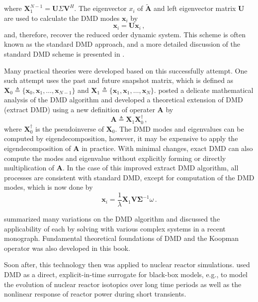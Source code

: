 where $\mathbf{X}_1^{N-1} = \mathbf{U}\Sigma \mathbf{V}^H$. 
The eigenvector $x_i$ of $\mathbf{\tilde{A}}$ and left eigenvector matrix $\mathbf{U}$ are used to calculate the DMD modes $\mathbf{\mathbf{x}}_i$ by 
\begin{equation}
\mathbf{\mathbf{x}}_i = \mathbf{U} \mathbf{x}_i \, ,
 \label{eq:dyanmic_modes}
\end{equation}
and, therefore, recover the reduced order dynamic system.
This scheme is often known as the standard DMD approach, and a more detailed discussion of the standard DMD scheme is presented in .   

Many practical theories were developed based on this successfully attempt.
One such attempt uses the past and future snapshot matrix, which is defined as $\mathbf{X}_0 \triangleq \{\mathbf{x}_0, \mathbf{x}_1, \ldots, \mathbf{x}_{N-1} \}$ and $\mathbf{X}_1 \triangleq \{\mathbf{x}_1, \mathbf{x}_1, \ldots, \mathbf{x}_{N} \} $. 
\citet{tu_dynamic_2014} posted a delicate mathematical analysis of the DMD algorithm and developed a theoretical extension of DMD (extract DMD) using a new definition of operater $\mathbf{A}$ by    
\begin{equation}
 \mathbf{A}\triangleq \mathbf{X}_1  \mathbf{X}_0^{\dagger}\, ,
 \label{eq:exact_dmd}
\end{equation}
where $\mathbf{X}_0^{\dagger}$ is the pseudoinverse of $\mathbf{X}_0$. 
The DMD modes and eigenvalues can be computed by eigendecomposition, however, it may be expensive to apply the eigendecomposition of $\mathbf{A}$ in practice.
With minimal changes, exact DMD can also compute the modes and eigenvalue without explicitly forming or directly multiplication of $\mathbf{A}$.
In the case of this improved extract DMD algorithm, all processes are consistent with standard DMD, except for computation of the DMD modes, which is now done by
\begin{equation}
 \mathbf{\mathbf{x}}_i = \frac{1}{\lambda} \mathbf{X}_1 \mathbf{V} \mathbf{\Sigma}^{-1} \omega \, .
 \label{eq:exact_dmd_free}
\end{equation}

\citet{kutz_dynamic_2016} summarized many variations on the DMD algorithm and discussed the applicability of each by solving with various complex systems in a recent monograph.
Fundamental theoretical foundations of DMD and the Koopman operator was also developed in this book.

Soon after, this technology then was applied to nuclear reactor simulations. 
\citet{abdo_data-driven_2018} used DMD as a direct, explicit-in-time surrogate for black-box models, e.g., to model the evolution of nuclear reactor isotopics over long time periods as well as the nonlinear response of reactor power during short transients.\cite{abdo_modeling_2019}\cite{elzohery2018comparison}


